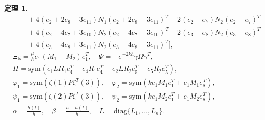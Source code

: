 \documentclass[a4paper, 12pt, oneside]{article}
\theoremstyle{cn_theorem}
\newtheorem{theorem}{定理}[section]
\begin{document}
\begin{theorem}
\begin{align*}
    & \quad \quad + 4(e_2 + 2e_8 - 3e_{11}) N_1 (e_2 + 2e_8 - 3e_{11})^T + 2(e_2 - e_7) N_2 (e_2 - e_7)^T \nonumber \\
    & \quad \quad + 4(e_2 - 4e_7 + 3e_{10}) N_2 (e_2 - 4e_7 + 3e_{10})^T + 2(e_3 - e_8) N_2 (e_3 - e_8)^T \nonumber \\
    & \quad \quad + 4(e_3 - 4e_8 + 3e_{11}) N_2 (e_3 - 4e_8 + 3e_{11})^T \Bigg], \\
    & \Xi_5 = \frac{\mu}{h} e_1(M_1 - M_2) e_1^T, \quad \Psi = -e^{-2kh} \gamma \Omega \gamma^T, \\
    & \Pi = \mathrm{sym}(e_1 L R_1 e_4^T - e_4 R_1 e_4^T + e_2 L R_2 e_5^T - e_5 R_2 e_5^T), \\
    & \varphi_1 = \mathrm{sym}(\zeta(1) P \zeta^T(3)), \quad \varphi_2 = \mathrm{sym}(k e_1 M_1 e_1^T + e_1 M_1 e_s^T), \\
    & \psi_1 = \mathrm{sym}(\zeta(2) P \zeta^T(3)), \quad \psi_2 = \mathrm{sym}(k e_1 M_2 e_1^T + e_1 M_2 e_s^T), \\
    & \alpha = \frac{h(t)}{h}, \quad \beta = \frac{h - h(t)}{h}, \quad L = \mathrm{diag}\{L_1, \dots, L_n\}.
\end{align*}
\end{theorem}
\end{document}
